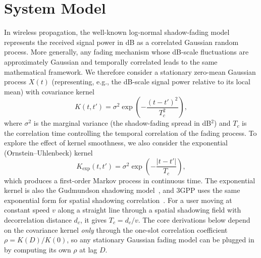 \documentclass[conference]{IEEEtran}
\begin{document}
\section{System Model}\label{sec:model}
In wireless propagation, the well-known log-normal shadow-fading model~\cite{gudmundson1991} represents the received signal power in dB as a correlated Gaussian random process. More generally, any fading mechanism whose dB-scale fluctuations are approximately Gaussian and temporally correlated leads to the same mathematical framework. We therefore consider a stationary zero-mean Gaussian process $X(t)$ (representing, e.g., the dB-scale signal power relative to its local mean) with covariance kernel
\begin{equation}\label{eq:sqexp}
K(t,t')=\sigma^2\exp\!\left(-\frac{(t-t')^2}{T_c^2}\right),
\end{equation}
where $\sigma^2$ is the marginal variance (the shadow-fading spread in dB$^2$) and $T_c$ is the correlation time controlling the temporal correlation of the fading process. To explore the effect of kernel smoothness, we also consider the exponential (Ornstein--Uhlenbeck) kernel
\begin{equation}\label{eq:exp}
K_{\exp}(t,t')=\sigma^2\exp\!\left(-\frac{|t-t'|}{T_c}\right),
\end{equation}
which produces a first-order Markov process in continuous time. The exponential kernel is also the Gudmundson shadowing model~\cite{gudmundson1991}, and 3GPP uses the same exponential form for spatial shadowing correlation~\cite[Sec.~7.4.4]{3gpp38901}. For a user moving at constant speed $v$ along a straight line through a spatial shadowing field with decorrelation distance $d_c$, it gives $T_c=d_c/v$. The core derivations below depend on the covariance kernel \emph{only} through the one-slot correlation coefficient $\rho=K(D)/K(0)$, so any stationary Gaussian fading model can be plugged in by computing its own $\rho$ at lag $D$.
\end{document}
